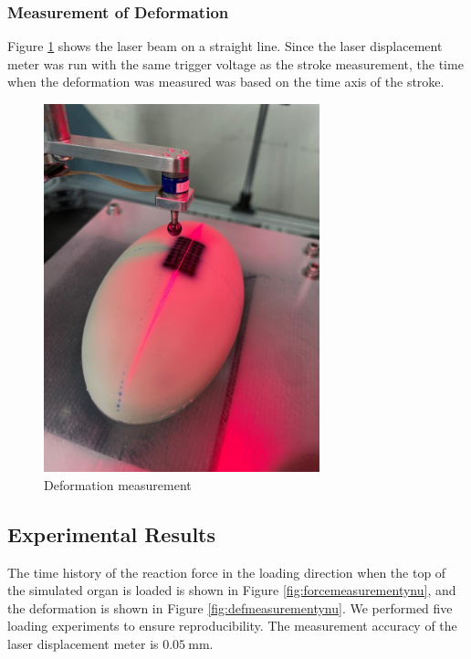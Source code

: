 \subsubsection*{Measurement of Deformation}
Figure \ref{fig:defmeasureynu} shows the laser beam on a straight line. Since the laser displacement meter was run with the same trigger voltage as the stroke measurement, the time when the deformation was measured was based on the time axis of the stroke.
\begin{figure}%
	\centering
   \quad
   \includegraphics[width=8cm]{Images/appendix/ynu/fig5laserlineonthesimulatedorgan.png}%
   \caption{Deformation measurement}%
   \label{fig:defmeasureynu}%
\end{figure}

\subsection*{Experimental Results}
The time history of the reaction force in the loading direction when the top of the simulated organ is loaded is shown 
in Figure \ref{fig:forcemeasurementynu}, and the deformation is shown in Figure \ref{fig:defmeasurementynu}. 
We performed five loading experiments to ensure reproducibility. The measurement accuracy of the laser displacement meter is
$\SI{0.05}{\milli \m}$.

